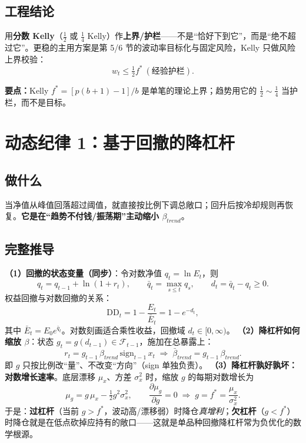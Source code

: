 \documentclass[UTF8,11pt]{ctexart}
\newcommand{\takeaway}[1]{\medskip\par\noindent\textbf{要点：}#1\par\medskip}
\begin{document}
\subsection{工程结论}
用\textbf{分数 Kelly}（$\tfrac12$ 或 $\tfrac14$ Kelly）作\textbf{上界/护栏}——不是“恰好下到它”，而是“绝不超过它”。更稳的主用方案是第 5/6 节的波动率目标化与固定风险，Kelly 只做风险上界校验：
$$
w_t \le \tfrac12 f^{*}\ (\text{经验护栏}).
$$

\takeaway{Kelly $f^{*}=[p(b+1)-1]/b$ 是单笔的理论上界；趋势用它的 $\tfrac12\sim\tfrac14$ 当护栏，而不是目标。}

\section{动态纪律 1：基于回撤的降杠杆}
\subsection{做什么}
当净值从峰值回落超过阈值，就直接按比例下调总敞口；回升后按冷却规则再恢复。\textbf{它是在“趋势不付钱/振荡期”主动缩小 $\beta_{trend}$}。
\subsection{完整推导}
\textbf{（1）回撤的状态变量（同步）}：令对数净值 $q_t=\ln E_t$，则
\begin{equation}
q_t=q_{t-1}+\ln(1+r_t),\qquad \bar q_t=\max_{s\le t}q_s,\qquad d_t=\bar q_t-q_t\ge0.
\end{equation}
权益回撤与对数回撤的关系：
\begin{equation}
\mathrm{DD}_t=1-\frac{E_t}{\bar E_t}=1-e^{-d_t},
\end{equation}
其中 $\bar E_t=E_0e^{\bar q_t}$。对数刻画适合乘性收益，回撤域 $d_t\in[0,\infty)$。
\textbf{（2）降杠杆如何缩放 $\beta$}：状态 $g_t=g(d_{t-1})\in\mathcal{F}_{t-1}$，施加在总暴露上：
\begin{equation}
r_t=g_{t-1}\,\beta_{trend}\,\mathrm{sign}_{t-1}\,x_t
\;\Rightarrow\;\bar\beta_{trend}=g_{t-1}\,\beta_{trend}.
\end{equation}
即 $g$ 只按比例改“量”、不改变“方向”（sign 单独负责）。
\textbf{（3）降杠杆孰好孰坏：对数增长速率}。底层漂移 $\mu_x$、方差 $\sigma_x^2$ 时，缩放 $g$ 的每期对数增长为
\begin{equation}
\mu_g = g\,\mu_x-\tfrac12 g^2\sigma_x^2,\qquad
\frac{\partial \mu_g}{\partial g}=0 \;\Rightarrow\; g=f^{*}=\frac{\mu_x}{\sigma_x^2}.
\end{equation}
于是：\textbf{过杠杆}（当前 $g>f^{*}$，波动高/漂移弱）时降仓\emph{真增利}；\textbf{欠杠杆}（$g<f^{*}$）时降仓就是在低点砍掉应持有的敞口——这就是单品种回撤降杠杆常为负优化的数学根源。
\end{document}
